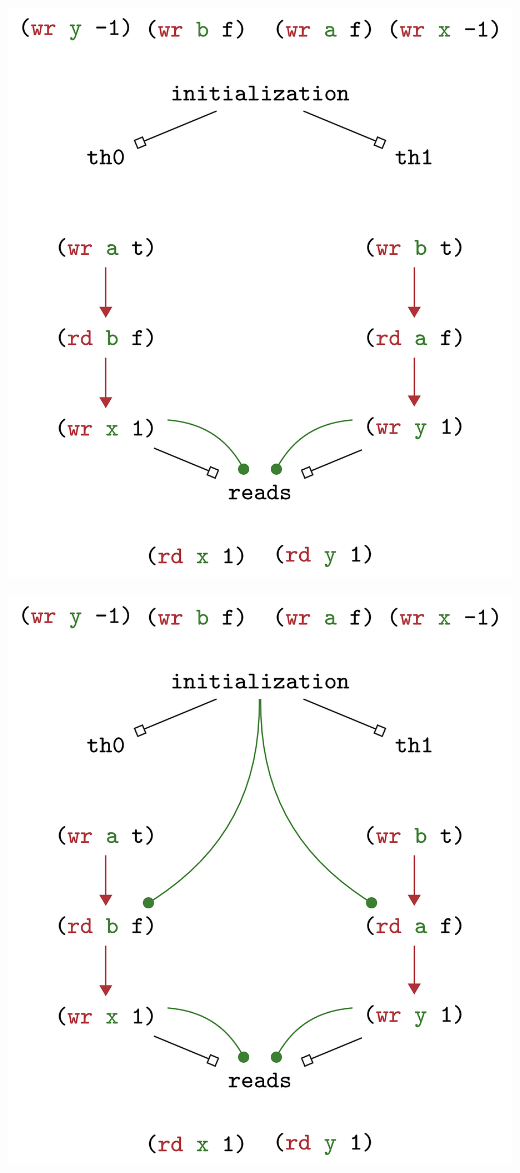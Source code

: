 \documentclass[aspectratio=1610, xcolor={dvipsnames}]{beamer}
\begin{document}
\begin{frame}
    \centering
    
    \includegraphics[height=0.9\textheight]{fig/trace5-11-4.jpg}

\end{frame}

\begin{frame}
    \centering
    
    \includegraphics[height=0.9\textheight]{fig/trace5-11-5.jpg}

\end{frame}
\end{document}
